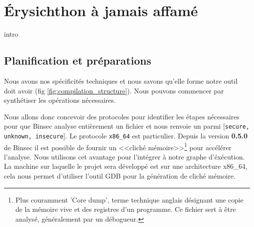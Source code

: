 \chapter{Érysichthon à jamais affamé}
\label{chap:erysichtonUsage}

intro


\section{Planification et préparations}

Nous avons nos spécificités techniques et nous savons qu'elle forme notre outil doit avoir (fig \ref{fig:compilation_structure}). Nous pouvons commencer par synthétiser les opérations nécessaires.\smallbreak

Nous allons donc concevoir des protocoles pour identifier les étapes nécessaires pour que Binsec analyse entièrement un fichier et nous renvoie un parmi [\texttt{secure, unknown, insecure}]. Le protocole \texttt{x86\_64} est particulier. Depuis la version \textbf{0.5.0} de Binsec il est possible de fournir un <<cliché mémoire>>\footnote{Plus couramment 'Core dump', terme technique anglais désignant une copie de la mémoire vive et des registres d'un programme. Ce fichier sert à être analysé, généralement par un débogueur.} pour accélérer l'analyse. Nous utilisons cet avantage pour l'intégrer à notre graphe d'éxécution. La machine sur laquelle le projet sera développé est sur une architecture x86\_64, cela nous permet d'utiliser l'outil GDB pour la génération de cliché mémoire.\medbreak

